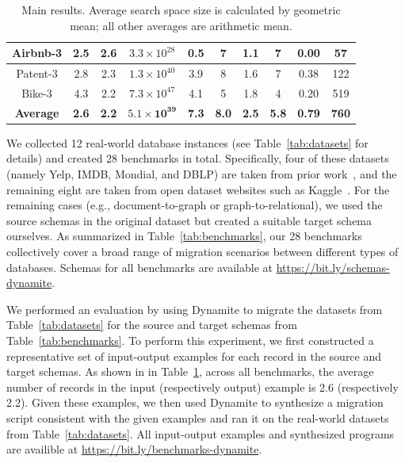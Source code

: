 \documentclass[]{article}
\begin{document}
\begin{table}
\begin{adjustbox}{width=1\textwidth}
\begin{tabular}{|c|c|c|c|c|c|c|c|c|c|}
                    \hline
                    Airbnb-3 & 2.5 & 2.6 & $3.3 \times 10^{28}$ & 0.5 & 7 & 1.1 & 7 & 0.00 & 57 \\
                    \hline
                    Patent-3 & 2.8 & 2.3 & $1.3 \times 10^{40}$ & 3.9 & 8 & 1.6 & 7 & 0.38 & 122 \\
                    \hline
                    Bike-3 & 4.3 & 2.2 & $7.3 \times 10^{47}$ & 4.1 & 5 & 1.8 & 4 & 0.20 & 519 \\
                    \hline
                    \hline
                    \textbf{Average} & \textbf{2.6} & \textbf{2.2} & $\mathbf{5.1 \times 10^{39}}$ & \textbf{7.3} & \textbf{8.0} & \textbf{2.5} & \textbf{5.8} & \textbf{0.79} & \textbf{760} \\
                    \hline
                    \end{tabular}
                    \end{adjustbox}
                    \vspace{5pt}
                    \caption{Main results. Average search space size is calculated by geometric mean; all other averages are arithmetic mean.}
                    \label{tab:results}
                    \vspace{-10pt}
                \end{table}


                We collected 12 real-world database instances (see Table~\ref{tab:datasets} for details) and created 28 benchmarks in total. Specifically, four of these datasets (namely Yelp, IMDB, Mondial, and DBLP) are taken from prior work~\cite{mitra-vldb18}, and the remaining eight are taken from open dataset websites such as Kaggle~\cite{kaggle-web}. For the remaining cases (e.g., document-to-graph or graph-to-relational), we used the source schemas in the original dataset but created a suitable target schema ourselves. As summarized in Table~\ref{tab:benchmarks}, our 28 benchmarks collectively cover a broad range of migration scenarios between different types of databases. Schemas for all benchmarks are available at \url{https://bit.ly/schemas-dynamite}.

                
                We performed an evaluation by using Dynamite to migrate the datasets from Table~\ref{tab:datasets} for the source and target schemas from Table~\ref{tab:benchmarks}. To perform this experiment, we first constructed a representative set of input-output examples for each record in the source and target schemas. As shown in in Table~\ref{tab:results}, across all benchmarks, the average number of records in the input (respectively output) example is 2.6 (respectively 2.2). Given these examples, we then used Dynamite to synthesize a migration script consistent with the given examples and ran it on the real-world datasets from Table~\ref{tab:datasets}. All input-output examples and synthesized programs are availible at \url{https://bit.ly/benchmarks-dynamite}. 
\end{document}
